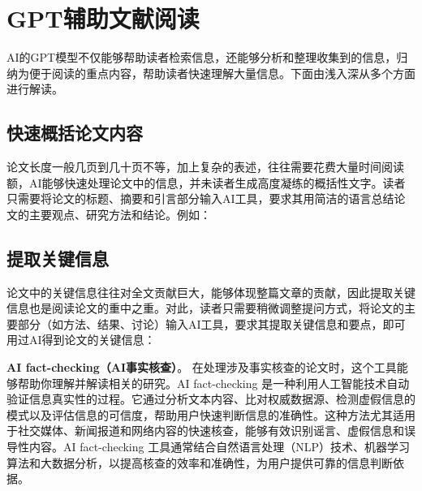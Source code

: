 \section{GPT辅助文献阅读}

AI的GPT模型不仅能够帮助读者检索信息，还能够分析和整理收集到的信息，归纳为便于阅读的重点内容，帮助读者快速理解大量信息。下面由浅入深从多个方面进行解读。

\subsection{快速概括论文内容}
论文长度一般几页到几十页不等，加上复杂的表述，往往需要花费大量时间阅读额，AI能够快速处理论文中的信息，并未读者生成高度凝练的概括性文字。读者只需要将论文的标题、摘要和引言部分输入AI工具，要求其用简洁的语言总结论文的主要观点、研究方法和结论。例如：

\subsection{提取关键信息}
论文中的关键信息往往对全文贡献巨大，能够体现整篇文章的贡献，因此提取关键信息也是阅读论文的重中之重。对此，读者只需要稍微调整提问方式，将论文的主要部分（如方法、结果、讨论）输入AI工具，要求其提取关键信息和要点，即可用过AI得到论文的关键信息：

\textbf{AI fact-checking（AI事实核查）}。
在处理涉及事实核查的论文时，这个工具能够帮助你理解并解读相关的研究。AI fact-checking 是一种利用人工智能技术自动验证信息真实性的过程。它通过分析文本内容、比对权威数据源、检测虚假信息的模式以及评估信息的可信度，帮助用户快速判断信息的准确性。这种方法尤其适用于社交媒体、新闻报道和网络内容的快速核查，能够有效识别谣言、虚假信息和误导性内容。AI fact-checking 工具通常结合自然语言处理（NLP）技术、机器学习算法和大数据分析，以提高核查的效率和准确性，为用户提供可靠的信息判断依据。

